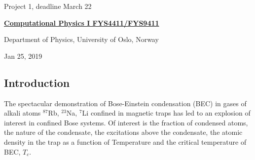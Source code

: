 \documentclass[%
oneside,                 %
final,                   %
10pt]{article}
\begin{document}

\newcommand{\exercisesection}[1]{\subsection*{#1}}






\thispagestyle{empty}

\begin{center}
{\LARGE\bf
\begin{spacing}{1.25}
Project 1, deadline  March 22 
\end{spacing}
}
\end{center}


\begin{center}
{\bf \href{{http://www.uio.no/studier/emner/matnat/fys/FYS4411/index-eng.html}}{Computational Physics I FYS4411/FYS9411}}
\end{center}

    \begin{center}
\centerline{{\small Department of Physics, University of Oslo, Norway}}
\end{center}
    

\begin{center}
Jan 25, 2019
\end{center}

\vspace{1cm}


\subsection*{Introduction}




 The spectacular demonstration of Bose-Einstein condensation (BEC) in gases of
 alkali atoms $^{87}$Rb, $^{23}$Na, $^7$Li confined in magnetic
 traps has led to an explosion of interest in
 confined Bose systems. Of interest is the fraction of condensed atoms, the
 nature of the condensate, the excitations above the condensate, the atomic
 density in the trap as a function of Temperature and the critical temperature of BEC,
 $T_c$. 
\end{document}
